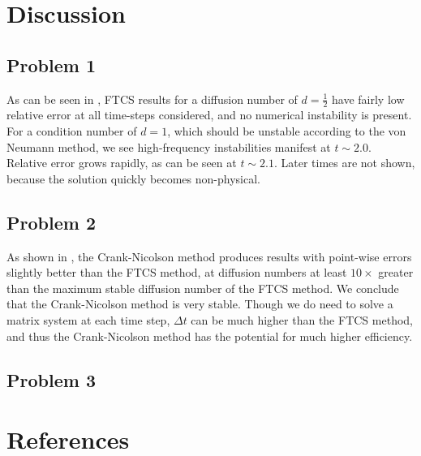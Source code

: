 \documentclass[11pt]{article}
\begin{document}
\section{Discussion} %

\subsection{Problem 1}

As can be seen in , FTCS results for a diffusion number of $d=\tfrac{1}{2}$ have fairly low relative error at all time-steps considered, and no numerical instability is present. For a condition number of $d=1$, which should be unstable according to the von Neumann method, we see high-frequency instabilities manifest at $t \sim 2.0$. Relative error grows rapidly, as can be seen at $t \sim 2.1$. Later times are not shown, because the solution quickly becomes non-physical.

\subsection{Problem 2}

As shown in , the Crank-Nicolson method produces results with point-wise errors slightly better than the FTCS method, at diffusion numbers at least $10\times$ greater than the maximum stable diffusion number of the FTCS method. We conclude that the Crank-Nicolson method is very stable. Though we do need to solve a matrix system at each time step, $\Delta t$ can be much higher than the FTCS method, and thus the Crank-Nicolson method has the potential for much higher efficiency.

\subsection{Problem 3}

\section{References} %
\end{document}
